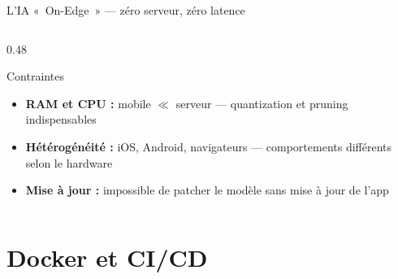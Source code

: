 \documentclass[aspectratio=169, 10pt]{beamer}
\begin{document}
\begin{frame}{L'IA «~On-Edge~» --- zéro serveur, zéro latence}
\begin{columns}[T]
\begin{column}{0.48\textwidth}
\begin{alertblock}{Contraintes}
        \begin{itemize}\setlength{\itemsep}{1pt}
          \item \textbf{RAM et CPU :} mobile $\ll$ serveur ---
                quantization et pruning indispensables
          \item \textbf{Hétérogénéité :} iOS, Android, navigateurs
                --- comportements différents selon le hardware
          \item \textbf{Mise à jour :} impossible de patcher le modèle
                sans mise à jour de l'app
        \end{itemize}
      \end{alertblock}
    \end{column}
  \end{columns}
\end{frame}

\section{Docker et CI/CD}
\end{document}
